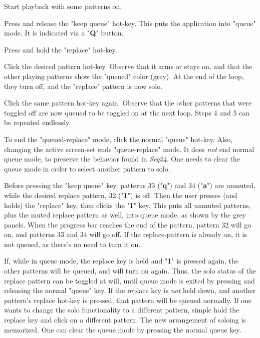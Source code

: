    \begin{enumber}
      \item Start playback with some patterns on. 
      \item Press and release
         the "keep queue" hot-key.  This puts the application into "queue" mode.
         It is indicated via a "\textbf{Q}" button.
      \item Press and hold the "replace" hot-key.
      \item Click the desired pattern hot-key.  Observe that it arms or
         stays on, and that the other playing patterns show the "queued" color
         (grey).  At the end of the loop, they turn off, and the "replace"
         pattern is now solo.
      \item Click the same pattern hot-key again.  Observe that the other
         patterns that were toggled off are now queued to be toggled on at the
         next loop.  Steps 4 and 5 can be repeated endlessly.
      \item To end
         the "queued-replace" mode, click the normal "queue"
         hot-key.  Also, changing the active screen-set ends "queue-replace"
         mode.  It does \textsl{not} end normal queue mode, to preserve the
         behavior found in \textsl{Seq24}.
         One needs to clear the queue mode in order to select another pattern
         to solo.
   \end{enumber}

   Before pressing the "keep queue" key, patterns 33 ("\textbf{q}")
   and 34 ("\textbf{a}") are
   unmuted, while the desired replace pattern, 32 ("\textbf{1}") is off.
   Then the user presses (and holds) the "replace" key, then clicks the
   "\textbf{1}" key.
   This puts all unmuted patterns, plus the muted
   replace pattern as well, into queue mode, as shown by the grey panels.
   When the progress bar reaches the end of the pattern, pattern 32 will go on,
   and patterns 33 and 34 will go off.
   If the replace-pattern is already on, it is not queued, as
   there's no need to turn it on.

   If, while in queue mode, the replace key is held and
   "\textbf{1}" is pressed again,
   the other patterns will be queued, and will turn on again.  Thus, the
   solo status of the replace pattern can be toggled at will, until queue mode
   is exited by pressing and releasing the normal "queue" key.
   If the replace key is \textsl{not} held down, and another pattern's replace
   hot-key is pressed, that pattern will be queued normally.
   If one wants to change the solo functionality to a different pattern,
   simple hold the replace key and click on a different pattern.  The new
   arrangement of soloing is memorized.
   One can clear the queue mode by pressing the normal queue key.

